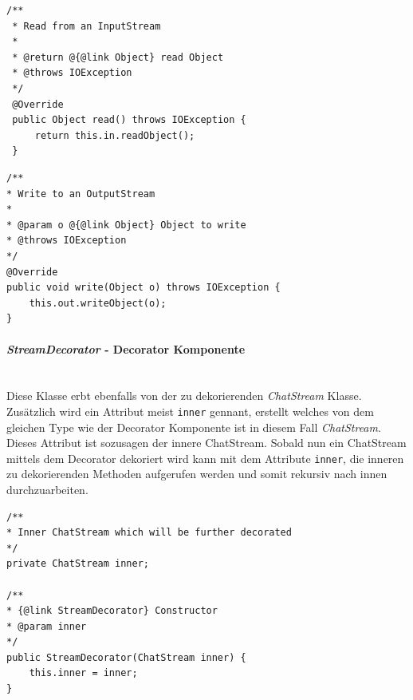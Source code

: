 			\begin{minipage}{.5\textwidth}
				\begin{lstlisting}[style=JavaL, caption={read - CoreChatStream}]
 /**
 * Read from an InputStream
 *
 * @return @{@link Object} read Object
 * @throws IOException
 */
 @Override
 public Object read() throws IOException {
	 return this.in.readObject();
 }
				\end{lstlisting}
			\end{minipage}%
			\begin{minipage}{.5\textwidth}
				\begin{lstlisting}[style=JavaR, caption={write - CoreChatStream}]
/**
* Write to an OutputStream
*
* @param o @{@link Object} Object to write
* @throws IOException
*/
@Override
public void write(Object o) throws IOException {
	this.out.writeObject(o);
}
				\end{lstlisting}
			\end{minipage}
			
			\paragraph{\textit{StreamDecorator} - Decorator Komponente}\mbox{}
			\vspace{0.15cm}\\
			Diese Klasse erbt ebenfalls von der zu dekorierenden \textit{ChatStream} Klasse.\\
			Zusätzlich wird ein Attribut meist \texttt{inner} gennant, erstellt welches von dem gleichen Type wie der Decorator Komponente ist in diesem Fall \textit{ChatStream}.
			Dieses Attribut ist sozusagen der innere ChatStream. Sobald nun ein ChatStream mittels dem Decorator dekoriert wird kann mit dem Attribute \texttt{inner}, die inneren zu dekorierenden Methoden aufgerufen werden und somit rekursiv nach innen durchzuarbeiten.
			
			\begin{lstlisting}[style=JavaG, caption={Konstruktor and inner StreamDecorator}]
/**
* Inner ChatStream which will be further decorated
*/
private ChatStream inner;

/**
* {@link StreamDecorator} Constructor
* @param inner
*/
public StreamDecorator(ChatStream inner) {
	this.inner = inner;
}
			\end{lstlisting}
			
